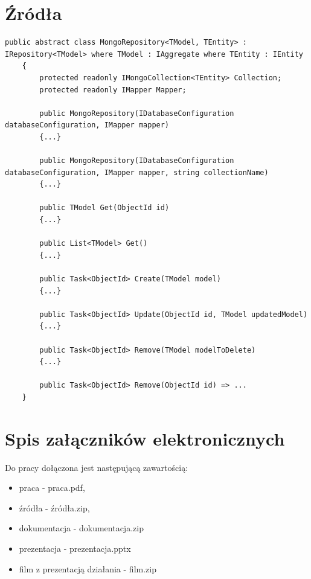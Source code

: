 \documentclass[a4paper,twoside,12pt]{book}
\begin{document}
\begin{appendices}
\chapter*{Źródła}
\begin{lstlisting}[caption={Klasa \textit{MongoRepository}}, label={lst:mongoRepository}, nolol=true]
	public abstract class MongoRepository<TModel, TEntity> : IRepository<TModel> where TModel : IAggregate where TEntity : IEntity
	{
		protected readonly IMongoCollection<TEntity> Collection;
		protected readonly IMapper Mapper;
		
		public MongoRepository(IDatabaseConfiguration databaseConfiguration, IMapper mapper)
		{...}
		
		public MongoRepository(IDatabaseConfiguration databaseConfiguration, IMapper mapper, string collectionName)
		{...}
		
		public TModel Get(ObjectId id)
		{...}
		
		public List<TModel> Get()
		{...}
		
		public Task<ObjectId> Create(TModel model)
		{...}
		
		public Task<ObjectId> Update(ObjectId id, TModel updatedModel)
		{...}
		
		public Task<ObjectId> Remove(TModel modelToDelete)
		{...}
		
		public Task<ObjectId> Remove(ObjectId id) => ...
	}
\end{lstlisting}

\chapter*{Spis załączników elektronicznych}

Do pracy dołączona jest następującą zawartością:
\begin{itemize}
\item praca - praca.pdf,
\item źródła - źródła.zip,
\item dokumentacja - dokumentacja.zip
\item prezentacja - prezentacja.pptx
\item film z prezentacją działania - film.zip
\end{itemize}

\listoffigures
	
\lstlistoflistings
	
\end{appendices}
\end{document}

